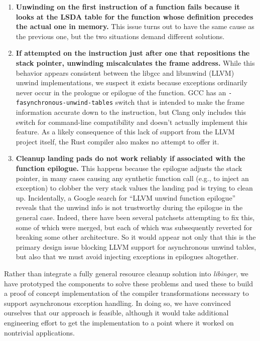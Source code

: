 \begin{enumerate}
\item \textbf{Unwinding on the first instruction of a function fails because it looks
at the LSDA table for the function whose definition precedes the actual one in
memory.}  This issue turns out to have the same cause as the previous one, but the
two situations demand different solutions.

\item \textbf{If attempted on the instruction just after one that repositions the
stack pointer, unwinding miscalculates the frame address.}  While this behavior
appears consistent between the libgcc and libunwind (LLVM) unwind implementations, we
suspect it exists because exceptions ordinarily never occur in the prologue or
epilogue of the function.  GCC has an \texttt{-fasynchronous-unwind-tables} switch
that is intended to make the frame information accurate down to the instruction, but
Clang only includes this switch for command-line compatibility and doesn't actually
implement this feature.  As a likely consequence of this lack of support from the
LLVM project itself, the Rust compiler also makes no attempt to offer it.

\item \textbf{Cleanup landing pads do not work reliably if associated with the
function epilogue.}  This happens because the epilogue adjusts the stack pointer,
in many cases causing any synthetic function call (e.g., to inject an exception) to
clobber the very stack values the landing pad is trying to clean up.  Incidentally,
a Google search for ``LLVM unwind function epilogue'' reveals that the unwind info is
not trustworthy during the epilogue in the general case.  Indeed, there have been
several patchsets attempting to fix this, some of which were merged, but each of
which was subsequently reverted for breaking some other architecture.  So it would
appear not only that this is the primary design issue blocking LLVM support for
asynchronous unwind tables, but also that we must avoid injecting exceptions in
epilogues altogether.

\end{enumerate}

Rather than integrate a fully general resource cleanup solution into
\textit{libinger}, we have prototyped the components to solve these problems and used
these to build a proof of concept implementation of the compiler transformations
necessary to support asynchronous exception handling.  In doing so, we have convinced
ourselves that our approach is feasible, although it would take additional
engineering effort to get the implementation to a point where it worked on nontrivial
applications.

